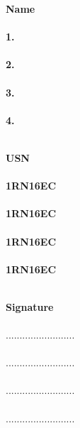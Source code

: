 \vspace{1.5cm}
\begin{minipage}[t]{0.4\textwidth}%

\textbf{\hspace{1.5cm}Name\\\\
1. \\\\
2. \\\\
3. \\\\
4. \\\\
}
\end{minipage}\hspace{0.06cm}
\begin{minipage}[t]{0.4\textwidth}%

\textbf{\hspace{0.7cm}USN\\\\
1RN16EC \\\\
1RN16EC \\\\
1RN16EC \\\\
1RN16EC \\\\
}
\end{minipage}
\begin{minipage}[t]{0.4\textwidth}%

\textbf{\hspace{0.4cm}Signature}\\\\
.........................\\\\
.........................\\\\
.........................\\\\
.........................\\\\
\end{minipage}
